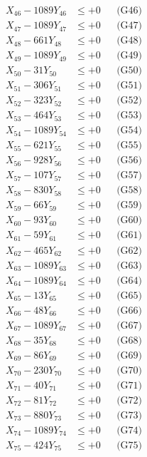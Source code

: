 \documentclass[a4paper,10pt]{article}
\begin{document}
{\begin{align}
X_{46} - 1089Y_{46} &\leq +0 && \text{(G46)} \\
X_{47} - 1089Y_{47} &\leq +0 && \text{(G47)} \\
X_{48} - 661Y_{48} &\leq +0 && \text{(G48)} \\
X_{49} - 1089Y_{49} &\leq +0 && \text{(G49)} \\
X_{50} - 31Y_{50} &\leq +0 && \text{(G50)} \\
\allowbreak
X_{51} - 306Y_{51} &\leq +0 && \text{(G51)} \\
X_{52} - 323Y_{52} &\leq +0 && \text{(G52)} \\
X_{53} - 464Y_{53} &\leq +0 && \text{(G53)} \\
X_{54} - 1089Y_{54} &\leq +0 && \text{(G54)} \\
X_{55} - 621Y_{55} &\leq +0 && \text{(G55)} \\
X_{56} - 928Y_{56} &\leq +0 && \text{(G56)} \\
X_{57} - 107Y_{57} &\leq +0 && \text{(G57)} \\
X_{58} - 830Y_{58} &\leq +0 && \text{(G58)} \\
X_{59} - 66Y_{59} &\leq +0 && \text{(G59)} \\
X_{60} - 93Y_{60} &\leq +0 && \text{(G60)} \\
\allowbreak
X_{61} - 59Y_{61} &\leq +0 && \text{(G61)} \\
X_{62} - 465Y_{62} &\leq +0 && \text{(G62)} \\
X_{63} - 1089Y_{63} &\leq +0 && \text{(G63)} \\
X_{64} - 1089Y_{64} &\leq +0 && \text{(G64)} \\
X_{65} - 13Y_{65} &\leq +0 && \text{(G65)} \\
X_{66} - 48Y_{66} &\leq +0 && \text{(G66)} \\
X_{67} - 1089Y_{67} &\leq +0 && \text{(G67)} \\
X_{68} - 35Y_{68} &\leq +0 && \text{(G68)} \\
X_{69} - 86Y_{69} &\leq +0 && \text{(G69)} \\
X_{70} - 230Y_{70} &\leq +0 && \text{(G70)} \\
\allowbreak
X_{71} - 40Y_{71} &\leq +0 && \text{(G71)} \\
X_{72} - 81Y_{72} &\leq +0 && \text{(G72)} \\
X_{73} - 880Y_{73} &\leq +0 && \text{(G73)} \\
X_{74} - 1089Y_{74} &\leq +0 && \text{(G74)} \\
X_{75} - 424Y_{75} &\leq +0 && \text{(G75)} \\

\end{align}}
\end{document}
